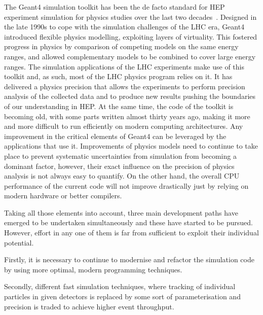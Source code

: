 The Geant4 simulation toolkit has been the de facto standard for HEP
experiment simulation for physics studies over the last two decades~\cite{Geant4-2003, Geant4-2006, Geant4-2016}.
Designed in the late 1990s to cope with the simulation challenges of the
LHC era, Geant4 introduced flexible physics modelling, exploiting layers
of virtuality. This fostered progress in physics by comparison of
competing models on the same energy ranges, and allowed complementary models
to be combined to cover large energy ranges. The simulation applications
of the LHC experiments make use of this toolkit and, as such, most of
the LHC physics program relies on it. It has delivered a physics
precision that allows the experiments to perform precision analysis of
the collected data and to produce new results pushing the boundaries of
our understanding in HEP. At the same time, the code of the toolkit is
becoming old, with some parts written almost thirty years ago, making it
more and more difficult to run efficiently on modern computing
architectures. Any improvement in the critical elements of Geant4 can be
leveraged by the applications that use it. 
Improvements of physics models need to continue to take place to prevent
systematic uncertainties from simulation from becoming a dominant
factor, however, their exact influence on the precision of physics
analysis is not always easy to quantify. On the other hand, the overall
CPU performance of the current code will not improve drastically just by
relying on modern hardware or better compilers. 

Taking all those elements into account, three main development paths have emerged to be
undertaken simultaneously and these have started to be pursued. However,
effort in any one of them is far from sufficient to exploit their
individual potential. 

Firstly, it is necessary to continue to modernise
and refactor the simulation code by using more optimal, modern
programming techniques. 


Secondly, different fast simulation techniques, where tracking of
individual particles in given detectors is replaced by some sort of
parameterisation and precision is traded to achieve higher event
throughput.

